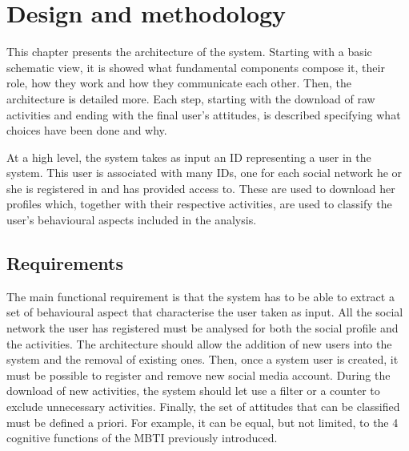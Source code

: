 \chapter{Design and methodology}
This chapter presents the architecture of the system. Starting with a basic schematic view, it is showed what fundamental components compose it, their role, how they work and how they communicate each other.
Then, the architecture is detailed more. Each step, starting with the download of raw activities and ending with the final user's attitudes, is described specifying what choices have been done and why.

At a high level, the system takes as input an ID representing a user in the system.
This user is associated with many IDs, one for each social network he or she is registered in and has provided access to.
These are used to download her profiles which, together with their respective activities, are used to classify the user's behavioural aspects included in the analysis.

\section{Requirements}
The main functional requirement is that the system has to be able to extract a set of behavioural aspect that characterise the user taken as input.
All the social network the user has registered must be analysed for both the social profile and the activities.
The architecture should allow the addition of new users into the system and the removal of existing ones. Then, once a system user is created, it must be possible to register and remove new social media account.
During the download of new activities, the system should let use a filter or a counter to exclude unnecessary activities.
Finally, the set of attitudes that can be classified must be defined a priori. For example, it can be equal, but not limited, to the 4 cognitive functions of the MBTI previously introduced.

